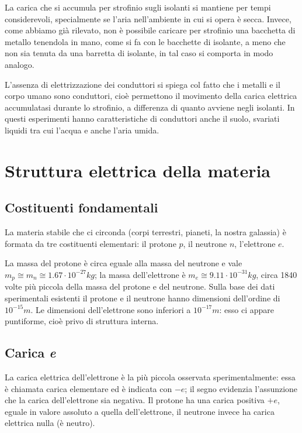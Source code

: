 \documentclass[class=book, crop=false, oneside, 12pt]{standalone}
\begin{document}
La carica che si accumula per strofinio sugli isolanti si mantiene per tempi considerevoli, specialmente se l'aria nell'ambiente in cui si opera è secca.  
Invece, come abbiamo già rilevato, non è possibile caricare per strofinio una bacchetta di metallo tenendola in mano, come si fa con le bacchette di isolante, a meno che non sia tenuta da una barretta di isolante, in tal caso si comporta in modo analogo.

L'assenza di elettrizzazione dei conduttori si spiega col fatto che i metalli e il corpo umano sono conduttori, cioè permettono il movimento della carica elettrica accumulatasi durante lo strofinio, a differenza di quanto avviene negli isolanti.
In questi esperimenti hanno caratteristiche di conduttori anche il suolo, svariati liquidi tra cui l'acqua e anche l'aria umida.

\section{Struttura elettrica della materia}

\subsection{Costituenti fondamentali}

La materia stabile che ci circonda (corpi terrestri, pianeti, la nostra galassia) è formata da tre costituenti elementari: il protone $p$, il neutrone $n$, l'elettrone $e$.

La massa del protone è circa eguale alla massa del neutrone e vale \(m_p \cong m_n \cong 1.67 \cdot 10^{-27} kg \); la massa dell'elettrone è \(m_e \cong 9.11 \cdot 10^{-31} kg\), circa 1840 volte più piccola della massa del protone e del neutrone.
Sulla base dei dati sperimentali esistenti il protone e il neutrone hanno dimensioni dell'ordine di \(10^{-15} m\).
Le dimensioni dell'elettrone sono inferiori a \(10^{-17} m\): esso ci appare puntiforme, cioè privo di struttura interna.

\subsection{Carica \emph{e}}

La carica elettrica dell'elettrone è la più piccola osservata sperimentalmente: essa è chiamata carica elementare ed è indicata con \(-e\); il segno evidenzia l'assunzione che la carica dell'elettrone sia negativa. 
Il protone ha una carica positiva \(+e\), eguale in valore assoluto a quella dell'elettrone, il neutrone invece ha carica elettrica nulla (è neutro).
\end{document}
